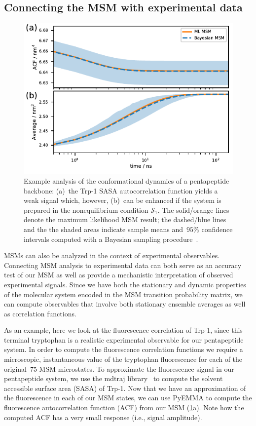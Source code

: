 \documentclass[9pt,tutorial]{livecoms}
\begin{document}
\subsection{Connecting the MSM with experimental data}

\begin{figure}
\includegraphics{figure_6}
\caption{Example analysis of the conformational dynamics of a pentapeptide backbone:
(a)~the Trp-1 SASA autocorrelation function yields a weak signal which, however,
(b)~can be enhanced if the system is prepared in the nonequilibrium condition $\mathcal{S}_1$.
The solid/orange lines denote the maximum likelihood MSM result;
the dashed/blue lines and the the shaded areas indicate sample means and~$95\%$ confidence intervals computed with a Bayesian sampling procedure~\cite{ben-rev-msm}.}
\label{fig:msm-exp-obs}
\end{figure}

MSMs can also be analyzed in the context of experimental observables.
Connecting MSM analysis to experimental data can both serve as an accuracy test of our MSM as well as provide a mechanistic interpretation of observed experimental signals.
Since we have both the stationary and dynamic properties of the molecular system encoded in the MSM transition probability matrix, we can compute observables that involve both stationary ensemble averages as well as correlation functions.

As an example, here we look at the fluorescence correlation of Trp-1, since this terminal tryptophan is a realistic experimental observable for our pentapeptide system.
In order to compute the fluorescence correlation functions we require a microscopic, instantaneous value of the tryptophan fluorescence for each of the original~$75$ MSM microstates.
To approximate the fluorescence signal in our pentapeptide system, we use the mdtraj library~\cite{mdtraj} to compute the solvent accessible surface area (SASA) of Trp-1.
Now that we have an approximation of the fluorescence in each of our MSM states, we can use PyEMMA to compute the fluorescence autocorrelation function (ACF) from our MSM (\ref{fig:msm-exp-obs}a).
Note how the computed ACF has a very small response (i.e., signal amplitude).
\end{document}

